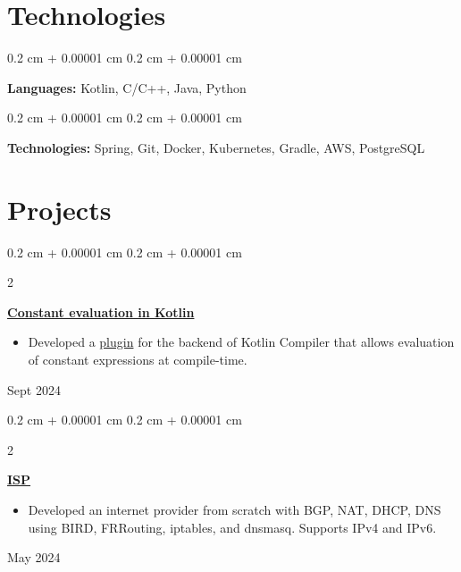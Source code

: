 \documentclass[10pt, letterpaper]{article}
\newenvironment{highlights}{
    \begin{itemize}[
        topsep=0.10 cm,
        parsep=0.10 cm,
        partopsep=0pt,
        itemsep=0pt,
        leftmargin=0.4 cm + 10pt
    ]
}{
    \end{itemize}
} %
\newenvironment{onecolentry}{
    \begin{adjustwidth}{
        0.2 cm + 0.00001 cm
    }{
        0.2 cm + 0.00001 cm
    }
}{
    \end{adjustwidth}
} %
\newenvironment{twocolentry}[2][]{
    \onecolentry
    \def\secondColumn{#2}
    \setcolumnwidth{\fill, 4.5 cm}
    \begin{paracol}{2}
}{
    \switchcolumn \raggedleft \secondColumn
    \end{paracol}
    \endonecolentry
} %
\begin{document}
    
    \section{Technologies}



        
        \begin{onecolentry}
            \textbf{Languages:} Kotlin, C/C++, Java, Python
        \end{onecolentry}

        \vspace{0.2 cm}

        \begin{onecolentry}
            \textbf{Technologies:} Spring, Git, Docker, Kubernetes, Gradle, AWS, PostgreSQL
        \end{onecolentry}


    
    \section{Projects}



        
        \begin{twocolentry}{
            Sept 2024
        }
            \textbf{\href{https://drive.google.com/file/d/1AD9tS-M0FZX2eGw5dcnHjX_YyEh3BLGl/view?usp=sharing}{Constant evaluation in Kotlin}}
            \begin{highlights}
                \item Developed a \href{https://github.com/SonyaBurg/kotlin-constexpr-support}{plugin} for the backend of Kotlin Compiler that allows evaluation of constant expressions at compile-time.
            \end{highlights}
        \end{twocolentry}


        \vspace{0.2 cm}

        \begin{twocolentry}{
            May 2024
        }
            \textbf{\href{https://github.com/asahium/isp}{ISP}}
            \begin{highlights}
                \item Developed an internet provider from scratch with BGP, NAT, DHCP, DNS using BIRD, FRRouting, iptables, and dnsmasq. Supports IPv4 and IPv6.
            \end{highlights}
        \end{twocolentry}
\end{document}
